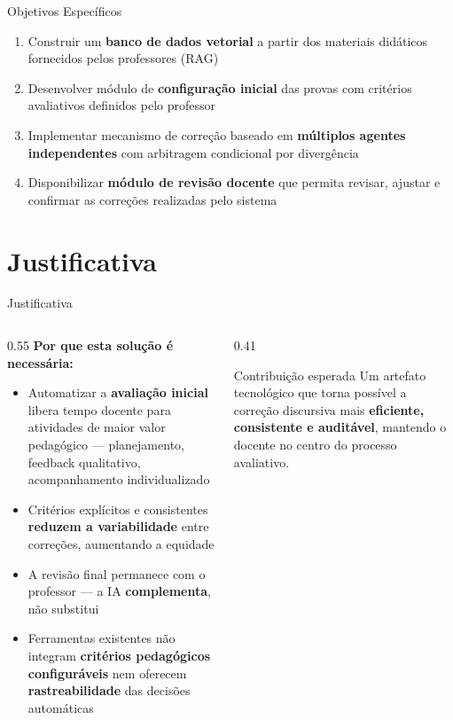 \documentclass[10pt,aspectratio=169]{beamer}
\begin{document}
\begin{frame}{Objetivos Específicos}
  \begin{enumerate}
    \item Construir um \textbf{banco de dados vetorial} a partir dos materiais didáticos fornecidos pelos professores (RAG)
    \item Desenvolver módulo de \textbf{configuração inicial} das provas com critérios avaliativos definidos pelo professor
    \item Implementar mecanismo de correção baseado em \textbf{múltiplos agentes independentes} com arbitragem condicional por divergência
    \item Disponibilizar \textbf{módulo de revisão docente} que permita revisar, ajustar e confirmar as correções realizadas pelo sistema
  \end{enumerate}
\end{frame}

\section{Justificativa}
\begin{frame}{Justificativa}
  \begin{columns}[T]
    \begin{column}{0.55\textwidth}
      \textbf{Por que esta solução é necessária:}
      \begin{itemize}
        \item Automatizar a \textbf{avaliação inicial} libera tempo docente para atividades de maior valor pedagógico — planejamento, feedback qualitativo, acompanhamento individualizado
        \item Critérios explícitos e consistentes \textbf{reduzem a variabilidade} entre correções, aumentando a equidade
        \item A revisão final permanece com o professor — a IA \textbf{complementa}, não substitui
        \item Ferramentas existentes não integram \textbf{critérios pedagógicos configuráveis} nem oferecem \textbf{rastreabilidade} das decisões automáticas
      \end{itemize}
    \end{column}
    \begin{column}{0.41\textwidth}
      \begin{block}{Contribuição esperada}
        Um artefato tecnológico que torna possível a correção discursiva mais \textbf{eficiente, consistente e auditável}, mantendo o docente no centro do processo avaliativo.
      \end{block}
    \end{column}
  \end{columns}
\end{frame}
\end{document}
